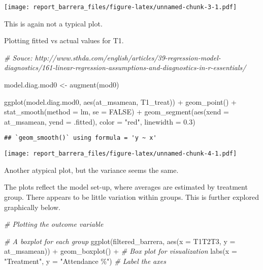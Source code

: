 \documentclass[
]{article}
\newenvironment{Shaded}{\begin{snugshade}}{\end{snugshade}}
\newcommand{\AttributeTok}[1]{\textcolor[rgb]{0.77,0.63,0.00}{#1}}
\newcommand{\CommentTok}[1]{\textcolor[rgb]{0.56,0.35,0.01}{\textit{#1}}}
\newcommand{\ConstantTok}[1]{\textcolor[rgb]{0.00,0.00,0.00}{#1}}
\newcommand{\FloatTok}[1]{\textcolor[rgb]{0.00,0.00,0.81}{#1}}
\newcommand{\FunctionTok}[1]{\textcolor[rgb]{0.00,0.00,0.00}{#1}}
\newcommand{\NormalTok}[1]{#1}
\newcommand{\OtherTok}[1]{\textcolor[rgb]{0.56,0.35,0.01}{#1}}
\newcommand{\SpecialCharTok}[1]{\textcolor[rgb]{0.00,0.00,0.00}{#1}}
\newcommand{\StringTok}[1]{\textcolor[rgb]{0.31,0.60,0.02}{#1}}
\begin{document}
\texttt{[image: report\_barrera\_files/figure-latex/unnamed-chunk-3-1.pdf]}

This is again not a typical plot.

Plotting fitted vs actual values for T1.

\begin{Shaded}
\begin{Highlighting}[]
\CommentTok{\# Souce: http://www.sthda.com/english/articles/39{-}regression{-}model{-}diagnostics/161{-}linear{-}regression{-}assumptions{-}and{-}diagnostics{-}in{-}r{-}essentials/}

\NormalTok{model.diag.mod0 }\OtherTok{\textless{}{-}} \FunctionTok{augment}\NormalTok{(mod0)}

\FunctionTok{ggplot}\NormalTok{(model.diag.mod0, }\FunctionTok{aes}\NormalTok{(at\_msamean, T1\_treat)) }\SpecialCharTok{+}
  \FunctionTok{geom\_point}\NormalTok{() }\SpecialCharTok{+}
  \FunctionTok{stat\_smooth}\NormalTok{(}\AttributeTok{method =}\NormalTok{ lm, }\AttributeTok{se =} \ConstantTok{FALSE}\NormalTok{) }\SpecialCharTok{+}
  \FunctionTok{geom\_segment}\NormalTok{(}\FunctionTok{aes}\NormalTok{(}\AttributeTok{xend =}\NormalTok{ at\_msamean, }\AttributeTok{yend =}\NormalTok{ .fitted), }\AttributeTok{color =} \StringTok{"red"}\NormalTok{, }\AttributeTok{linewidth =} \FloatTok{0.3}\NormalTok{)}
\end{Highlighting}
\end{Shaded}

\begin{verbatim}
## `geom_smooth()` using formula = 'y ~ x'
\end{verbatim}

\texttt{[image: report\_barrera\_files/figure-latex/unnamed-chunk-4-1.pdf]}

Another atypical plot, but the variance seems the same.

The plots reflect the model set-up, where averages are estimated by
treatment group. There appears to be little variation within groups.
This is further explored graphically below.

\begin{Shaded}
\begin{Highlighting}[]
\CommentTok{\# Plotting the outcome variable}

\CommentTok{\# A boxplot for each group}
\FunctionTok{ggplot}\NormalTok{(filtered\_barrera, }\FunctionTok{aes}\NormalTok{(}\AttributeTok{x =}\NormalTok{ T1T2T3, }\AttributeTok{y =}\NormalTok{ at\_msamean)) }\SpecialCharTok{+}
  \FunctionTok{geom\_boxplot}\NormalTok{() }\SpecialCharTok{+}    \CommentTok{\# Box plot for visualization}
  \FunctionTok{labs}\NormalTok{(}\AttributeTok{x =} \StringTok{"Treatment"}\NormalTok{, }\AttributeTok{y =} \StringTok{"Attendance \%"}\NormalTok{)  }\CommentTok{\# Label the axes}
\end{Highlighting}
\end{Shaded}
\end{document}
